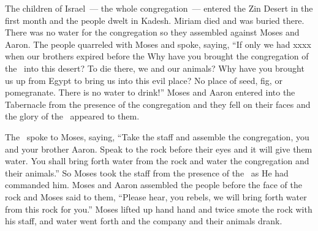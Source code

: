 
\begin{inparaenum}
   The children of Israel~--- the whole congregation~--- entered the Zin Desert in the first month and the people dwelt in Kadesh. Miriam died and was buried there.%
   There was no water for the congregation so they assembled against Moses and Aaron.%
   The people quarreled with Moses and spoke, saying, ``If only we had xxxx when our brothers expired before the \lord%
   Why have you brought the congregation of the \lord\ into this desert? To die there, we and our animals?%
   Why have you brought us up from Egypt to bring us into this evil place? No place of seed, fig, or pomegranate. There is no water to drink!''%
   Moses and Aaron entered into the Tabernacle from the presence of the congregation and they fell on their faces and the glory of the \lord\ appeared to them.%

   The \lord\ spoke to Moses, saying,%
   ``Take the staff and assemble the congregation, you and your brother Aaron. Speak to the rock before their eyes and it will give them water. You shall bring forth water from the rock and water the congregation and their animals.''%
   So Moses took the staff from the presence of the \lord\ as He had commanded him.%
   Moses and Aaron assembled the people before the face of the rock and Moses said to them, ``Please hear, you rebels, we will bring forth water from this rock for you.''%
   Moses lifted up hand hand and twice smote the rock with his staff, and water went forth and the company and their animals drank.%


\end{inparaenum}
